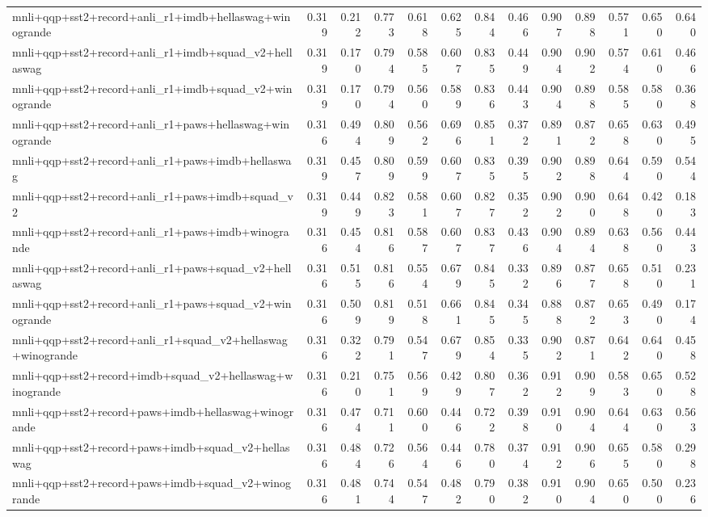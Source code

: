 \begin{table}[t]
\begin{tabular}{lrrrrrrrrrrrr}
    mnli+qqp+sst2+record+anli\_r1+imdb+hellaswag+winogrande & 0.319 & 0.212 & 0.773 & 0.618 & 0.625 & 0.844 & 0.466 & 0.907 & 0.898 & 0.571 & 0.650 & 0.640 \\
    mnli+qqp+sst2+record+anli\_r1+imdb+squad\_v2+hellaswag & 0.319 & 0.170 & 0.794 & 0.585 & 0.607 & 0.835 & 0.449 & 0.904 & 0.902 & 0.574 & 0.610 & 0.466 \\
    mnli+qqp+sst2+record+anli\_r1+imdb+squad\_v2+winogrande & 0.319 & 0.170 & 0.794 & 0.560 & 0.589 & 0.836 & 0.443 & 0.904 & 0.898 & 0.585 & 0.580 & 0.368 \\
    mnli+qqp+sst2+record+anli\_r1+paws+hellaswag+winogrande & 0.316 & 0.494 & 0.809 & 0.562 & 0.696 & 0.851 & 0.372 & 0.891 & 0.872 & 0.658 & 0.630 & 0.495 \\
    mnli+qqp+sst2+record+anli\_r1+paws+imdb+hellaswag & 0.319 & 0.457 & 0.809 & 0.599 & 0.607 & 0.835 & 0.395 & 0.902 & 0.898 & 0.644 & 0.590 & 0.544 \\
    mnli+qqp+sst2+record+anli\_r1+paws+imdb+squad\_v2 & 0.319 & 0.449 & 0.823 & 0.581 & 0.607 & 0.827 & 0.352 & 0.902 & 0.900 & 0.648 & 0.420 & 0.183 \\
    mnli+qqp+sst2+record+anli\_r1+paws+imdb+winogrande & 0.316 & 0.454 & 0.816 & 0.587 & 0.607 & 0.837 & 0.436 & 0.904 & 0.894 & 0.638 & 0.560 & 0.443 \\
    mnli+qqp+sst2+record+anli\_r1+paws+squad\_v2+hellaswag & 0.316 & 0.515 & 0.816 & 0.554 & 0.679 & 0.845 & 0.332 & 0.896 & 0.877 & 0.658 & 0.510 & 0.231 \\
    mnli+qqp+sst2+record+anli\_r1+paws+squad\_v2+winogrande & 0.316 & 0.509 & 0.819 & 0.518 & 0.661 & 0.845 & 0.345 & 0.888 & 0.872 & 0.653 & 0.490 & 0.174 \\
    mnli+qqp+sst2+record+anli\_r1+squad\_v2+hellaswag+winogrande & 0.316 & 0.322 & 0.791 & 0.547 & 0.679 & 0.854 & 0.335 & 0.902 & 0.871 & 0.642 & 0.640 & 0.458 \\
    mnli+qqp+sst2+record+imdb+squad\_v2+hellaswag+winogrande & 0.316 & 0.210 & 0.751 & 0.569 & 0.429 & 0.807 & 0.362 & 0.912 & 0.909 & 0.583 & 0.650 & 0.528 \\
    mnli+qqp+sst2+record+paws+imdb+hellaswag+winogrande & 0.316 & 0.474 & 0.711 & 0.600 & 0.446 & 0.722 & 0.398 & 0.910 & 0.904 & 0.644 & 0.630 & 0.563 \\
    mnli+qqp+sst2+record+paws+imdb+squad\_v2+hellaswag & 0.316 & 0.484 & 0.726 & 0.564 & 0.446 & 0.780 & 0.374 & 0.912 & 0.906 & 0.655 & 0.580 & 0.298 \\
    mnli+qqp+sst2+record+paws+imdb+squad\_v2+winogrande & 0.316 & 0.481 & 0.744 & 0.547 & 0.482 & 0.790 & 0.382 & 0.910 & 0.904 & 0.650 & 0.500 & 0.236 \\

\end{tabular}
\end{table}
